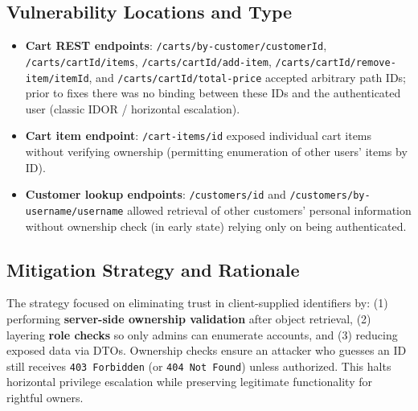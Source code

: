 \documentclass[]{UCD_CS_FYP_Report}
\begin{document}
\subsection{Vulnerability Locations and Type}
\begin{itemize}
	\item \textbf{Cart REST endpoints}: \texttt{/carts/by-customer/{customerId}}, \texttt{/carts/{cartId}/items}, \texttt{/carts/{cartId}/add-item}, \texttt{/carts/{cartId}/remove-item/{itemId}}, and \texttt{/carts/{cartId}/total-price} accepted arbitrary path IDs; prior to fixes there was no binding between these IDs and the authenticated user (classic IDOR / horizontal escalation).
	\item \textbf{Cart item endpoint}: \texttt{/cart-items/{id}} exposed individual cart items without verifying ownership (permitting enumeration of other users' items by ID).\newline
	\item \textbf{Customer lookup endpoints}: \texttt{/customers/{id}} and \texttt{/customers/by-username/{username}} allowed retrieval of other customers' personal information without ownership check (in early state) relying only on being authenticated.
\end{itemize}

\subsection{Mitigation Strategy and Rationale}
The strategy focused on eliminating trust in client-supplied identifiers by: (1) performing \textbf{server-side ownership validation} after object retrieval, (2) layering \textbf{role checks} so only admins can enumerate accounts, and (3) reducing exposed data via DTOs. Ownership checks ensure an attacker who guesses an ID still receives \texttt{403 Forbidden} (or \texttt{404 Not Found}) unless authorized. This halts horizontal privilege escalation while preserving legitimate functionality for rightful owners.
\end{document}
